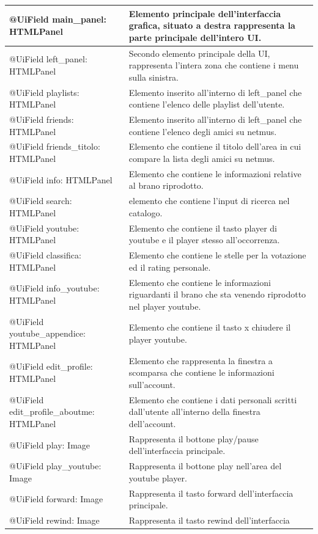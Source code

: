 \begin{longtable}{|p{}|p{}|}
@UiField main\_panel: HTMLPanel & Elemento principale dell'interfaccia
grafica, situato a destra rappresenta la parte principale dell'intero
UI.\\\hline @UiField left\_panel: HTMLPanel & Secondo elemento principale
della UI, rappresenta l'intera zona che contiene i menu sulla sinistra.\\\hline
@UiField playlists: HTMLPanel & Elemento inserito all'interno di
left\_panel che contiene l'elenco delle playlist dell'utente.\\\hline
@UiField friends: HTMLPanel & Elemento inserito all'interno di
left\_panel che contiene l'elenco degli amici su netmus.\\\hline
@UiField friends\_titolo: HTMLPanel & Elemento che contiene il titolo
dell'area in cui compare la lista degli amici su netmus.\\\hline
@UiField info: HTMLPanel & Elemento che contiene le informazioni
relative al brano riprodotto.\\\hline
@UiField search: HTMLPanel & elemento che contiene l'input di ricerca
nel catalogo.\\\hline
@UiField youtube: HTMLPanel & Elemento che contiene il tasto player di
youtube e il player stesso all'occorrenza.\\\hline
@UiField classifica: HTMLPanel & Elemento che contiene le stelle per la
votazione ed il rating personale.\\\hline
@UiField info\_youtube: HTMLPanel & Elemento che contiene le informazioni
riguardanti il brano che sta venendo riprodotto nel player youtube.\\\hline
@UiField youtube\_appendice: HTMLPanel & Elemento che contiene il tasto
x chiudere il player youtube.\\\hline
@UiField edit\_profile: HTMLPanel & Elemento che rappresenta la finestra
a scomparsa che contiene le informazioni sull'account.\\\hline
@UiField edit\_profile\_aboutme: HTMLPanel & Elemento che contiene i
dati personali scritti dall'utente all'interno della finestra
dell'account.\\\hline
@UiField play: Image & Rappresenta il bottone play/pause
dell'interfaccia principale.\\\hline
@UiField play\_youtube: Image & Rappresenta il bottone play nell'area del
youtube player.\\\hline
@UiField forward: Image & Rappresenta il tasto forward dell'interfaccia
principale.\\\hline
@UiField rewind: Image & Rappresenta il tasto rewind dell'interfaccia

\end{longtable}
